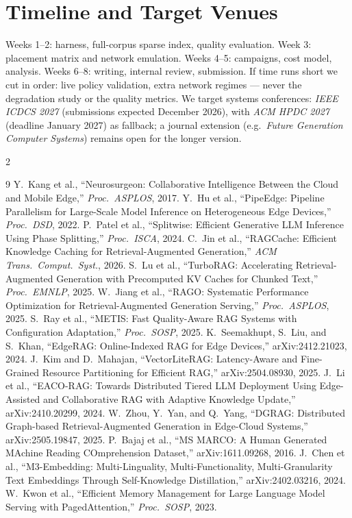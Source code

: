\documentclass[10pt]{article}
\begin{document}
\section{Timeline and Target Venues}
Weeks 1--2: harness, full-corpus sparse index, quality evaluation. Week 3: placement matrix and
network emulation. Weeks 4--5: campaigns, cost model, analysis. Weeks 6--8: writing, internal
review, submission. If time runs short we cut in order: live policy validation, extra network
regimes --- never the degradation study or the quality metrics. We target systems conferences:
\emph{IEEE ICDCS 2027} (submissions expected December 2026), with \emph{ACM HPDC 2027}
(deadline January 2027) as fallback; a journal extension (e.g.\ \emph{Future Generation Computer
Systems}) remains open for the longer version.

\begin{multicols}{2}
\begin{thebibliography}{9}\scriptsize
{} Y.~Kang et al., ``Neurosurgeon: Collaborative Intelligence Between the Cloud
and Mobile Edge,'' \emph{Proc.\ ASPLOS}, 2017.
 Y.~Hu et al., ``PipeEdge: Pipeline Parallelism for Large-Scale Model Inference on
Heterogeneous Edge Devices,'' \emph{Proc.\ DSD}, 2022.
 P.~Patel et al., ``Splitwise: Efficient Generative LLM Inference Using Phase
Splitting,'' \emph{Proc.\ ISCA}, 2024.
 C.~Jin et al., ``RAGCache: Efficient Knowledge Caching for Retrieval-Augmented
Generation,'' \emph{ACM Trans.\ Comput.\ Syst.}, 2026.
 S.~Lu et al., ``TurboRAG: Accelerating Retrieval-Augmented Generation with
Precomputed KV Caches for Chunked Text,'' \emph{Proc.\ EMNLP}, 2025.
 W.~Jiang et al., ``RAGO: Systematic Performance Optimization for Retrieval-Augmented
Generation Serving,'' \emph{Proc.\ ASPLOS}, 2025.
 S.~Ray et al., ``METIS: Fast Quality-Aware RAG Systems with Configuration
Adaptation,'' \emph{Proc.\ SOSP}, 2025.
 K.~Seemakhupt, S.~Liu, and S.~Khan, ``EdgeRAG: Online-Indexed RAG for Edge
Devices,'' arXiv:2412.21023, 2024.
 J.~Kim and D.~Mahajan, ``VectorLiteRAG: Latency-Aware and Fine-Grained
Resource Partitioning for Efficient RAG,'' arXiv:2504.08930, 2025.
 J.~Li et al., ``EACO-RAG: Towards Distributed Tiered LLM Deployment Using
Edge-Assisted and Collaborative RAG with Adaptive Knowledge Update,'' arXiv:2410.20299, 2024.
 W.~Zhou, Y.~Yan, and Q.~Yang, ``DGRAG: Distributed Graph-based Retrieval-Augmented
Generation in Edge-Cloud Systems,'' arXiv:2505.19847, 2025.
 P.~Bajaj et al., ``MS MARCO: A Human Generated MAchine Reading COmprehension
Dataset,'' arXiv:1611.09268, 2016.
 J.~Chen et al., ``M3-Embedding: Multi-Linguality, Multi-Functionality,
Multi-Granularity Text Embeddings Through Self-Knowledge Distillation,'' arXiv:2402.03216, 2024.
 W.~Kwon et al., ``Efficient Memory Management for Large Language Model Serving with
PagedAttention,'' \emph{Proc.\ SOSP}, 2023.
\end{thebibliography}
\end{multicols}
\end{document}
